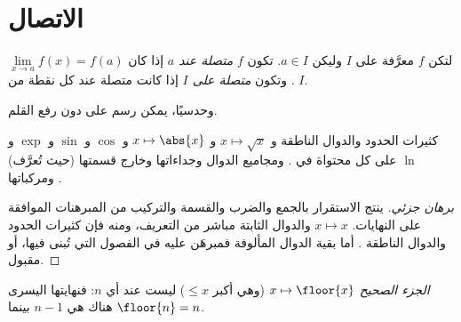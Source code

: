 \section{الاتصال}

\begin{definition}[الاتصال]\label{def:g12:limcont:continuity}
لتكن $f$ معرَّفة على  $I$ وليكن $a \in I$. تكون  $f$
\emph{متصلة عند $a$} إذا كان
$\lim\limits_{x \to a} f(x) = f(a)$. وتكون \emph{متصلة على $I$} إذا كانت
متصلة عند كل نقطة من $I$.
\end{definition}

وحدسيًا، يمكن رسم   على 
دون رفع القلم.

\begin{proposition}\label{prop:g12:limcont:usual}
كثيرات الحدود والدوال الناطقة و $x \mapsto \sqrt{x}$ و $x \mapsto \abs{x}$
و $\cos$ و $\sin$ و $\exp$ و $\ln$  على كل  محتواة
في . ومجاميع الدوال  وجداءاتها وخارج قسمتها (حيث تُعرَّف) ومركباتها
.
\end{proposition}

\begin{proof}[برهان جزئي]
ينتج الاستقرار بالجمع والضرب والقسمة والتركيب من
المبرهنات الموافقة على النهايات.  $x \mapsto x$ والدوال
الثابتة مباشر من التعريف، ومنه فإن كثيرات الحدود والدوال الناطقة
. أما  بقية الدوال المألوفة
فمبرهَن عليه في الفصول التي تُبنى فيها، أو مقبول.
\end{proof}

\begin{example}
\emph{ الجزء الصحيح} $x \mapsto \floor{x}$ (وهي أكبر 
$\leq x$) ليست  عند أي  $n$: فنهايتها اليسرى هناك هي
$n - 1$ بينما $\floor{n} = n$.
\end{example}

